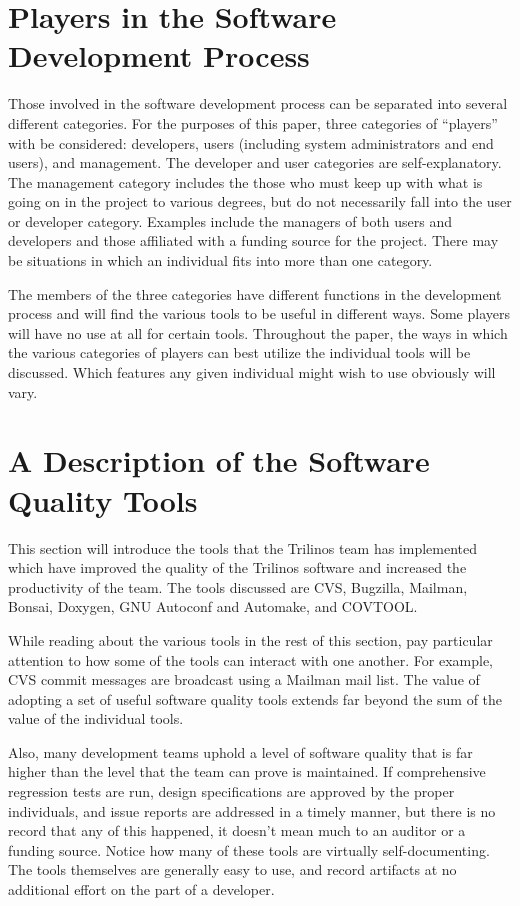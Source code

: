 \documentclass[12pt,relax]{article}
\begin{document}
\section{Players in the Software Development Process}
Those involved in the software development process can be separated into 
several different categories.  For the purposes of this paper, three 
categories of ``players'' with be considered: developers, users (including 
system administrators and end users), and management.  The developer and user 
categories are self-explanatory.  The management category includes the those 
who must keep up with what is going on in the project to various degrees, but 
do not necessarily fall into the user or developer category.  Examples include 
the managers of both users and developers and those affiliated with a funding 
source for the project.  There may be situations in which an individual fits 
into more than one category.

The members of the three categories have different functions in the 
development process and will find the various tools to be useful 
in different ways.  Some players will have no use at all for certain tools.
Throughout the paper, the ways in which the various categories of players 
can best utilize the individual tools will be discussed.  Which features any 
given individual might wish to use obviously will vary.

\section{A Description of the Software Quality Tools}
\label{Section:CommunicationTools}

This section will introduce the tools that the Trilinos team has implemented 
which have improved the quality of the Trilinos software and increased the 
productivity of the team.  The tools discussed are CVS, Bugzilla, Mailman, 
Bonsai, Doxygen, GNU Autoconf and Automake, and COVTOOL.

While reading about the various tools in the rest of this section, pay 
particular attention to how some of the tools can interact with one another.
For example, CVS commit messages are broadcast using a Mailman mail list.
The value of adopting a set of useful software quality tools extends far 
beyond the sum of the value of the individual tools.

Also, many development teams uphold a level of software quality that is far 
higher than the level that the team can prove is maintained.  If comprehensive
regression tests are run, design specifications are approved by the 
proper individuals, and issue reports are addressed in a timely manner, but 
there is no record that any of this happened, it doesn't mean much to an 
auditor or a funding source.  Notice how many of these tools are virtually
self-documenting.  The tools themselves are generally easy to use, and 
record artifacts at no additional effort on the part of a developer.  
\end{document}
